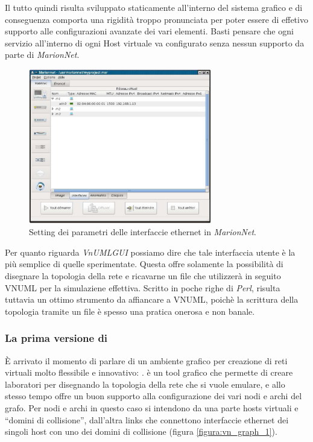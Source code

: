 Il tutto quindi risulta sviluppato staticamente all'interno del sistema grafico e di conseguenza comporta una rigidità troppo pronunciata per poter essere di effetivo supporto alle configurazioni avanzate dei vari elementi. Basti pensare che ogni servizio all'interno di ogni Host virtuale va configurato senza nessun supporto da parte di \emph{MarionNet}.

\begin{figure}[!ht]
	\centering
	\includegraphics[width=8cm]{images/marionnet_interfaces.png}
	\caption{Setting dei parametri delle interfaccie ethernet in \emph{MarionNet}.}
	\label{figura:marionnet_interfaces}
\end{figure}

Per quanto riguarda \emph{VnUMLGUI} possiamo dire che tale interfaccia utente è la più semplice di quelle sperimentate. Questa offre solamente la possibilità di disegnare la topologia della rete e ricavarne un file \xml che utilizzerà in seguito VNUML per la simulaziene effettiva. Scritto in poche righe di \emph{Perl}, risulta tuttavia un ottimo strumento da affiancare a VNUML, poichè la scrittura della topologia tramite un file \xml è spesso una pratica onerosa e non banale.

\subsubsection{La prima versione di \visualnetkit{}}
È arrivato il momento di parlare di un ambiente grafico per creazione di reti virtuali molto flessibile e innovativo: \visualnetkit{}. \visualnetkit{} è un tool grafico che permette di creare laboratori per \netkit{} disegnando la topologia della rete che si vuole emulare, e allo stesso tempo offre un buon supporto alla configurazione dei vari nodi e archi del grafo. Per nodi e archi in questo caso si intendono da una parte hosts virtuali e ``domini di collisione'', dall'altra links che connettono interfaccie ethernet dei singoli host con uno dei domini di collisione (figura \ref{figura:vn_graph_1}).

